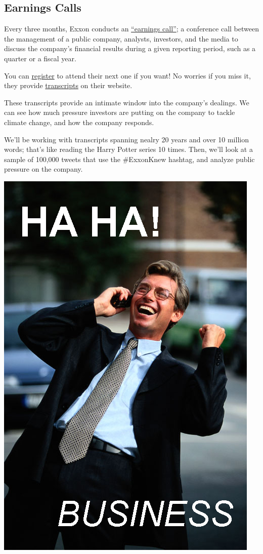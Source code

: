 \documentclass[
  letterpaper,
  DIV=11,
  numbers=noendperiod]{scrreprt}
\begin{document}
\hypertarget{earnings-calls}{%
\subsection{Earnings Calls}\label{earnings-calls}}

Every three months, Exxon conducts an
\href{https://www.investopedia.com/terms/e/earnings-call.asp}{``earnings
call''}; a conference call between the management of a public company,
analysts, investors, and the media to discuss the company's financial
results during a given reporting period, such as a quarter or a fiscal
year.

You can
\href{https://globalmeet.webcasts.com/starthere.jsp?ei=1488251\&tp_key=440e363aaf}{register}
to attend their next one if you want! No worries if you miss it, they
provide
\href{https://corporate.exxonmobil.com/Investors/Investor-relations/Investor-materials-archive\#Quarterlyearningsmaterials}{transcripts}
on their website.

These transcripts provide an intimate window into the company's
dealings. We can see how much pressure investors are putting on the
company to tackle climate change, and how the company responds.

We'll be working with transcripts spanning nealry 20 years and over 10
million words; that's like reading the Harry Potter series 10 times.
Then, we'll look at a sample of 100,000 tweets that use the \#ExxonKnew
hashtag, and analyze public pressure on the company.

\includegraphics{index_files/mediabag/business.jpg}
\end{document}
